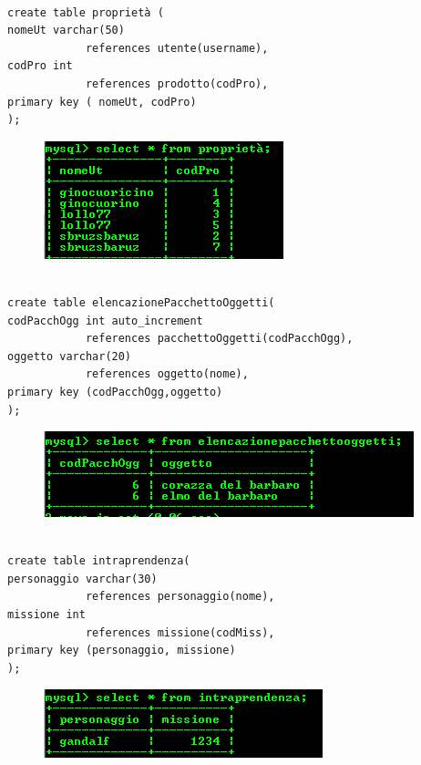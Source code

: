\begin{verbatim}

create table proprietà ( 
nomeUt varchar(50) 
			references utente(username), 
codPro int 
			references prodotto(codPro), 
primary key ( nomeUt, codPro)
);
\end{verbatim}

\begin{figure}[H]
\centering
\includegraphics[width=0.7\linewidth]{immagini/17}
\caption{}
\label{fig:1}
\end{figure}

\begin{verbatim}

create table elencazionePacchettoOggetti( 
codPacchOgg int auto_increment 
			references pacchettoOggetti(codPacchOgg), 
oggetto varchar(20)
			references oggetto(nome), 
primary key (codPacchOgg,oggetto)
);
\end{verbatim}

\begin{figure}[H]
\centering
\includegraphics[width=0.7\linewidth]{immagini/18}
\caption{}
\label{fig:1}
\end{figure}

\begin{verbatim}

create table intraprendenza(
personaggio varchar(30) 
			references personaggio(nome), 
missione int  
			references missione(codMiss), 
primary key (personaggio, missione)
);
\end{verbatim}

\begin{figure}[H]
\centering
\includegraphics[width=0.7\linewidth]{immagini/19}
\caption{}
\label{fig:1}
\end{figure}


